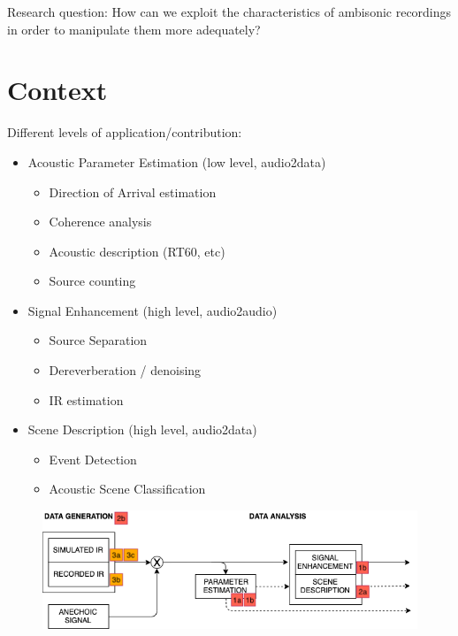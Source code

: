 Research question: 	How can we exploit the characteristics of ambisonic recordings in order to manipulate them more adequately? 


\section{Context}

Different levels of application/contribution:

\begin{itemize}
	\item Acoustic Parameter Estimation (low level, audio2data)
	\begin{itemize}
		\item Direction of Arrival estimation
		\item Coherence analysis
		\item Acoustic description (RT60, etc)
		\item Source counting
	\end{itemize}

	\item Signal Enhancement  (high level, audio2audio)
	\begin{itemize}
		\item Source Separation
		\item Dereverberation / denoising
		\item IR estimation
	\end{itemize}

	\item Scene Description (high level, audio2data)
	\begin{itemize}
		\item Event Detection
		\item Acoustic Scene Classification
	\end{itemize}
\end{itemize}

\begin{figure}[hbt]
  \includegraphics[width=\textwidth]{Figures/context_scheme.png}
  \caption{}
\end{figure}


